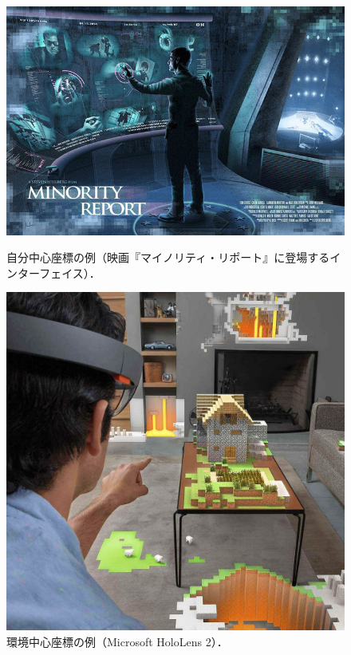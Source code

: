 \begin{figure}[htbp]
  \begin{minipage}[b]{0.50\linewidth}
    \centering
    \includegraphics[keepaspectratio, width=\linewidth]{fig/development/minority-report.png}
    \caption{自分中心座標の例（映画『マイノリティ・リポート』に登場するインターフェイス\cite{minorityreport}）．}
    \label{fig:minority-report}
  \end{minipage}
  \begin{minipage}[t]{0.50\linewidth}
    \centering
    \includegraphics[keepaspectratio, width=0.7\linewidth]{fig/development/hololens.png}
    \caption{環境中心座標の例（Microsoft HoloLens 2\cite{hololens}）．}
    \label{fig:hololens}
  \end{minipage}
\end{figure}

